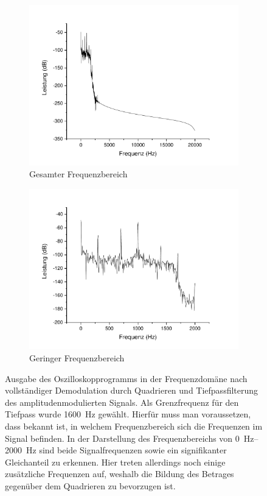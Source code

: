 \documentclass[
a4paper,
12pt,
pagesize,
ngerman
]{scrartcl}
\begin{document}
	\begin{figure}[H]
		\centering
		\begin{subfigure}[t]{0.495\textwidth}
			\centering
			\includegraphics[width=1\textwidth]{Origin-Files/AM-Demod-Quadrat-demod}
			\caption{Gesamter Frequenzbereich}
		\end{subfigure}
		\begin{subfigure}[t]{0.495\textwidth}
			\centering
			\includegraphics[width=1\textwidth]{Origin-Files/AM-Demod-Quadrat-demod-Bereich}
			\caption{Geringer Frequenzbereich}
		\end{subfigure}
	
		\caption{Ausgabe des Oszilloskopprogramms in der Frequenzdomäne nach vollständiger Demodulation durch Quadrieren und Tiefpassfilterung des amplitudenmodulierten Signals.
		Als Grenzfrequenz für den Tiefpass wurde \SI{1600}{\hertz} gewählt.
		Hierfür muss man voraussetzen, dass bekannt ist, in welchem Frequenzbereich sich die Frequenzen im Signal befinden.
		In der Darstellung des Frequenzbereichs von \SIrange{0}{2000}{\hertz} sind beide Signalfrequenzen sowie ein signifikanter Gleichanteil zu erkennen.
		Hier treten allerdings noch einige zusätzliche Frequenzen auf, weshalb die Bildung des Betrages gegenüber dem Quadrieren zu bevorzugen ist.
		}
		\centering
		\label{fig_tag3_am_demod_quadrat_vollst}
	\end{figure}
\end{document}
